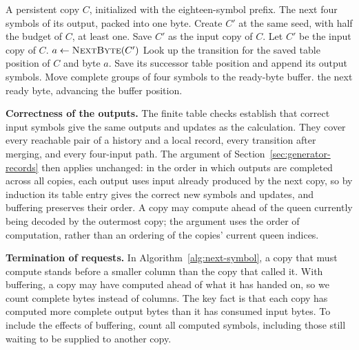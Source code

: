 \begin{algorithm}[!ht]
\caption{Supplying four earlier symbols to a table lookup}
\label{alg:recursive-generation}
\renewcommand{\algorithmicrequire}{\textbf{Input:}}
\renewcommand{\algorithmicensure}{\textbf{Output:}}
\begin{algorithmic}[1]
\Require A persistent copy $C$, initialized with the eighteen-symbol prefix.
\Ensure The next four symbols of its output, packed into one byte.
      \State Create $C'$ at the same seed, with half the budget of $C$, at least one.
      \State Save $C'$ as the input copy of $C$.
    \EndIf
    \State Let $C'$ be the input copy of $C$.
    \Repeat
      \State $a\gets\Call{NextByte}{C'}$
      \State Look up the transition for the saved table position of $C$ and byte $a$.
      \State Save its successor table position and append its output symbols.
      \State Move complete groups of four symbols to the ready-byte buffer.
  \EndIf
  \State \Return the next ready byte, advancing the buffer position.
\EndFunction
\end{algorithmic}
\end{algorithm}

\medskip\noindent
\textbf{Correctness of the outputs.}
The finite table checks establish that correct input symbols give the
same outputs and updates as the calculation. They cover every
reachable pair of a history and a local record, every transition
after merging, and every four-input path. The argument of
Section~\ref{sec:generator-records} then applies unchanged: in the
order in which outputs are completed across all copies, each output
uses input already produced by the next copy, so by induction its
table entry gives the correct new symbols and updates, and buffering
preserves their order. A copy may compute ahead of the queen
currently being decoded by the outermost copy; the argument uses the
order of computation, rather than an ordering of the copies' current
queen indices.

\medskip\noindent
\textbf{Termination of requests.}
In Algorithm~\ref{alg:next-symbol}, a copy that must compute stands
before a smaller column than the copy that called it. With buffering,
a copy may have computed ahead of what it has handed on, so we count
complete bytes instead of columns. The key fact is that each copy has
computed more complete output bytes than it has consumed input bytes.
To include the effects of buffering, count all computed symbols,
including those still waiting to be supplied to another copy.

